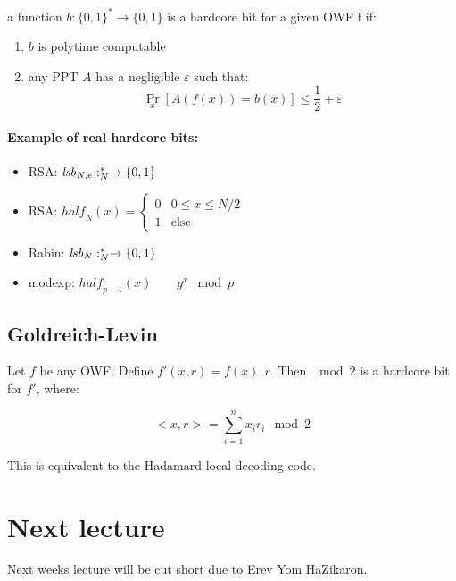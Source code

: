 \documentclass{idc_msc}
\let\ints\relax
\newcommand{\ints}{\ensuremath{\mathbb{Z}}}
\begin{document}
a function \(b: \{0,1\}^* \to \{0,1\}\) is a hardcore bit for a given OWF f if:

\begin{enumerate}
  \item \(b\) is polytime computable
  \item any PPT \(A\) has a negligible \(\varepsilon\) such that:
  \[
  \Pr_{x}[A(f(x)) = b(x)] \le \frac{1}{2} + \varepsilon
  \]
\end{enumerate}

\paragraph{Example of real hardcore bits:}

\begin{itemize}
  \item RSA: \(\mathit{lsb}_{N,e} : \ints_{N}^* \to \{0,1\}\)
  \item RSA: \(\mathit{half}_N(x) = \begin{cases}0 & 0 \le x \le N/2 \\ 1 & \text{else}\end{cases}\)
  \item Rabin: \(\mathit{lsb}_{N} : \ints_{N}^* \to \{0,1\}\)
  \item modexp: \(\mathit{half}_{p-1}(x) \qquad g^x \mod p\)
\end{itemize}

\subsection{Goldreich-Levin}

Let \(f\) be any OWF.
Define \(f'(x, r) = f(x), r\).
Then \(<x,r> \mod 2\) is a hardcore bit for \(f'\), where:

\[
  <x,r> = \sum_{i=1}^n x_ir_i \mod 2
\]

This is equivalent to the Hadamard local decoding code.

\section{Next lecture}

Next weeks lecture will be cut short due to Erev Yom HaZikaron.
\end{document}

